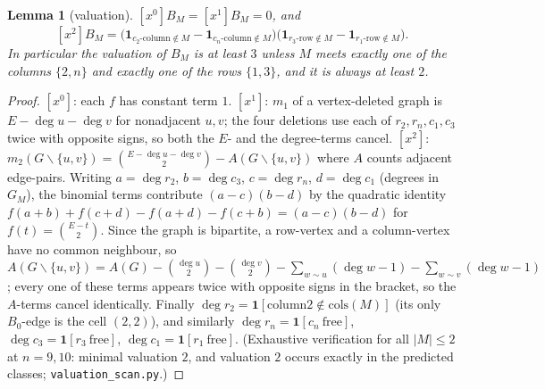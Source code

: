 \documentclass[11pt]{article}
\newtheorem{lemma}[theorem]{Lemma}
\theoremstyle{definition}
\begin{document}
\begin{lemma}[valuation]\label{lem:valuation}
$[x^0]B_M=[x^1]B_M=0$, and
\[
[x^2]B_M=\bigl(\mathbf 1_{c_2\text{-column}\notin M}-\mathbf 1_{c_n\text{-column}\notin M}\bigr)
\bigl(\mathbf 1_{r_3\text{-row}\notin M}-\mathbf 1_{r_1\text{-row}\notin M}\bigr).
\]
In particular the valuation of $B_M$ is at least $3$ unless $M$ meets
exactly one of the columns $\{2,n\}$ \emph{and} exactly one of the rows
$\{1,3\}$, and it is always at least $2$.
\end{lemma}

\begin{proof}
$[x^0]$: each $f$ has constant term $1$.  $[x^1]$: $m_1$ of a vertex-deleted
graph is $E-\deg u-\deg v$ for nonadjacent $u,v$; the four deletions use
each of $r_2,r_n,c_1,c_3$ twice with opposite signs, so both the $E$- and
the degree-terms cancel.  $[x^2]$: $m_2(G\smallsetminus\{u,v\})=
\binom{E-\deg u-\deg v}{2}-A(G\smallsetminus\{u,v\})$ where $A$ counts
adjacent edge-pairs.  Writing $a=\deg r_2$, $b=\deg c_3$, $c=\deg r_n$,
$d=\deg c_1$ (degrees in $G_M$), the binomial terms contribute
$(a-c)(b-d)$ by the quadratic identity
$f(a{+}b)+f(c{+}d)-f(a{+}d)-f(c{+}b)=(a-c)(b-d)$ for
$f(t)=\binom{E-t}{2}$.  Since the graph is bipartite, a row-vertex and a
column-vertex have no common neighbour, so
$A(G\smallsetminus\{u,v\})=A(G)-\binom{\deg u}{2}-\binom{\deg v}{2}
-\sum_{w\sim u}(\deg w-1)-\sum_{w\sim v}(\deg w-1)$; every one of these
terms appears twice with opposite signs in the bracket, so the $A$-terms
cancel identically.  Finally $\deg r_2=\mathbf 1[\text{column
}2\notin\mathrm{cols}(M)]$ (its only $B_0$-edge is the cell $(2,2)$),
and similarly $\deg r_n=\mathbf 1[c_n\ \mathrm{free}]$,
$\deg c_3=\mathbf 1[r_3\ \mathrm{free}]$, $\deg c_1=\mathbf 1[r_1\ \mathrm{free}]$.
(Exhaustive verification for all $|M|\le2$ at $n=9,10$:
minimal valuation $2$, and valuation $2$ occurs exactly in the predicted
classes; \texttt{valuation\_scan.py}.)
\end{proof}
\end{document}
